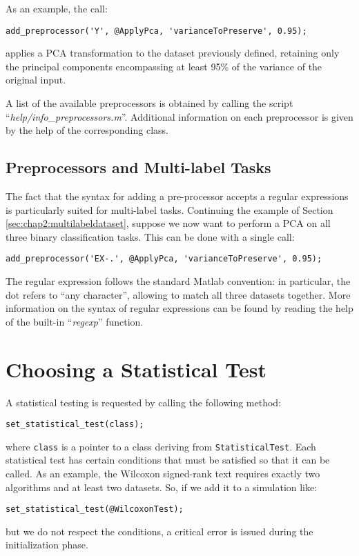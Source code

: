 \noindent As an example, the call:

\begin{lstlisting}
add_preprocessor('Y', @ApplyPca, 'varianceToPreserve', 0.95);
\end{lstlisting}

\noindent applies a PCA transformation to the dataset previously defined, retaining only the principal components encompassing at least 95\% of the variance of the original input.

A list of the available preprocessors is obtained by calling the script ``\textit{help/info\_preprocessors.m}''. Additional information on each preprocessor is given by the help of the corresponding class.

\subsection{Preprocessors and Multi-label Tasks}

The fact that the syntax for adding a pre-processor accepts a regular expressions is particularly suited for multi-label tasks. Continuing the example of Section \ref{sec:chap2:multilabeldataset}, suppose we now want to perform a PCA on all three binary classification tasks. This can be done with a single call:

\begin{lstlisting}
add_preprocessor('EX-.', @ApplyPca, 'varianceToPreserve', 0.95);
\end{lstlisting}

\noindent The regular expression follows the standard Matlab convention: in particular, the dot refers to ``any character'', allowing to match all three datasets together. More information on the syntax of regular expressions can be found by reading the help of the built-in ``\textit{regexp}'' function.

\section{Choosing a Statistical Test}

A statistical testing is requested by calling the following method:

\begin{lstlisting}
set_statistical_test(class);
\end{lstlisting}

\noindent where \verb|class| is a pointer to a class deriving from \verb|StatisticalTest|. Each statistical test has certain conditions that must be satisfied so that it can be called. As an example, the Wilcoxon signed-rank text requires exactly two algorithms and at least two datasets. So, if we add it to a simulation like:

\begin{lstlisting}
set_statistical_test(@WilcoxonTest);
\end{lstlisting}

\noindent but we do not respect the conditions, a critical error is issued during the initialization phase.